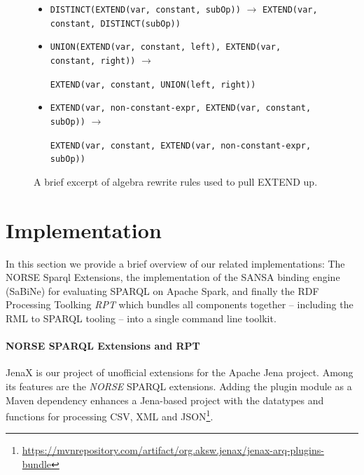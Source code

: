 \begin{figure}[!h]
\begin{itemize}
    \setlength\itemsep{-0.5em}
    \item \lstinline{DISTINCT(EXTEND(var, constant, subOp))} $\rightarrow$ \lstinline{EXTEND(var, constant, DISTINCT(subOp))}
    \item \lstinline{UNION(EXTEND(var, constant, left), EXTEND(var, constant, right))} $\rightarrow$
    
    \hspace{1cm}\lstinline{EXTEND(var, constant, UNION(left, right))}
    \item \lstinline{EXTEND(var, non-constant-expr, EXTEND(var, constant, subOp))} $\rightarrow$
    
    \hspace{1cm}\lstinline{EXTEND(var, constant, EXTEND(var, non-constant-expr, subOp))}
\end{itemize}
\vspace*{-5mm}
\caption{A brief excerpt of algebra rewrite rules used to pull EXTEND up.}
\label{fig:pull-extend}
\end{figure}

\section{Implementation}
\label{sec:implementation}
In this section we provide a brief overview of our related implementations: The NORSE Sparql Extensions, the implementation of the SANSA binding engine (SaBiNe) for evaluating SPARQL on Apache Spark, and finally the RDF Processing Toolking \emph{RPT} which bundles all components together -- including the RML to SPARQL tooling -- into a single command line toolkit.

\paragraph{NORSE SPARQL Extensions and RPT}
JenaX is our project of unofficial extensions for the Apache Jena project. Among its features are the \emph{NORSE} SPARQL extensions. Adding the plugin module as a Maven dependency enhances a Jena-based project with the datatypes and functions for processing CSV, XML and JSON\footnote{\url{https://mvnrepository.com/artifact/org.aksw.jenax/jenax-arq-plugins-bundle}}.


